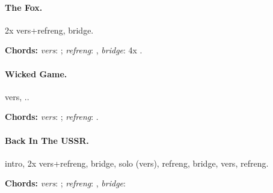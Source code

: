 \documentclass[%
twoside,                 %
draft,                   %
final,                   %
10pt]{article}
\begin{document}
\paragraph{The Fox.}
2x vers+refreng, bridge.

\textbf{Chords:} \emph{vers}: ; \emph{refreng}: , \emph{bridge}: 4x
.




\paragraph{Wicked Game.}
vers, ..

\textbf{Chords:} \emph{vers}: ; \emph{refreng}: .





\paragraph{Back In The USSR.}
intro, 2x vers+refreng, bridge, solo (vers), refreng, bridge, vers, refreng.

\textbf{Chords:} \emph{vers}: ; \emph{refreng}: ,
\emph{bridge}: 







\printindex
\end{document}
